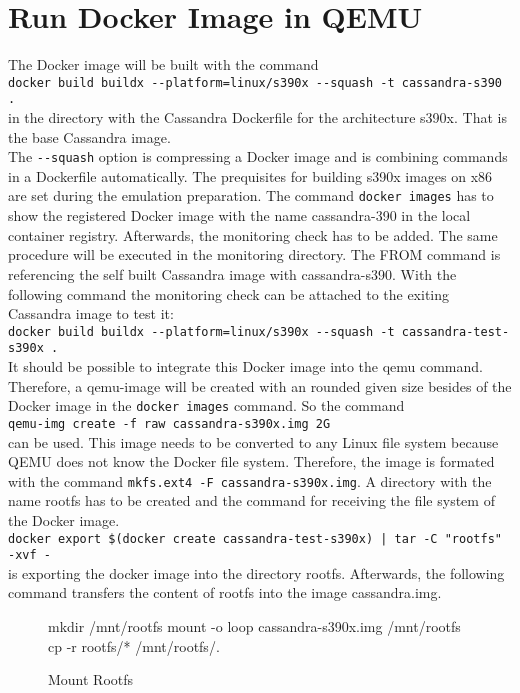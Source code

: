 \section{Run Docker Image in QEMU}\label{RunningDockerImage}

The Docker image will be built with the command  \\
\lstinline!docker build buildx --platform=linux/s390x --squash -t cassandra-s390 .! \\
in the directory with the Cassandra Dockerfile  for the architecture s390x. That is the base Cassandra image.\\
The \verb+--squash+ option is compressing a Docker image and is combining commands in a Dockerfile automatically. The prequisites for building s390x images on x86 are set during the emulation preparation. The command \lstinline!docker images! has to show the registered Docker image with the name cassandra-390 in the local container registry. Afterwards, the monitoring check has to be added. 
The same procedure will be executed in the monitoring directory. The FROM command is referencing the self built Cassandra image with cassandra-s390. With the following command the monitoring check can be attached to the exiting Cassandra image to test it: \\
\verb+docker build buildx --platform=linux/s390x --squash -t cassandra-test-s390x .+ \\
It should be possible to integrate this Docker image into the qemu command. Therefore, a qemu-image will be created with an rounded given size besides of the Docker image in the  \lstinline!docker images! command. So the command \\  
\lstinline!qemu-img create -f raw cassandra-s390x.img 2G!  \\
can be used. This image needs to be converted to any Linux file system because \gls{QEMU} does not know the Docker file system. Therefore, the image is formated with the command  \lstinline!mkfs.ext4 -F cassandra-s390x.img!. A directory with the name rootfs has to be created and the command for receiving the file system of the Docker image. \\
\lstinline!docker export $(docker create cassandra-test-s390x) | tar -C "rootfs" -xvf -!  \\ 
is exporting the docker image into the directory rootfs. Afterwards, the following command transfers the content of rootfs into the image cassandra.img.

\begin{figure}[H]
\centering
\begin{boxedverbatim}
mkdir /mnt/rootfs
mount -o loop cassandra-s390x.img /mnt/rootfs
cp -r rootfs/* /mnt/rootfs/.
\end{boxedverbatim}
 \caption{Mount Rootfs}
    \label{Mount-Rootfs}
\end{figure}

